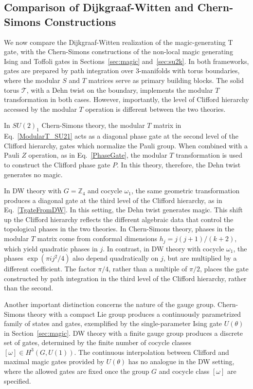 \documentclass[12pt,a4paper]{article}
\begin{document}
\subsection{Comparison of Dijkgraaf-Witten and Chern-Simons Constructions}\label{subsec:DW_vs_CS}

We now compare the Dijkgraaf-Witten realization of the magic-generating T gate, with the Chern-Simons constructions of the non-local magic generating Ising and Toffoli gates in Sections~\ref{sec:magic} and~\ref{sec:su2k}. In both frameworks, gates are prepared by path integration over $3$-manifolds with torus boundaries, where the modular $S$ and $T$ matrices serve as primary building blocks. The solid torus $\mathcal{T}$, with a Dehn twist on the boundary, implements the modular $T$ transformation in both cases. However, importantly, the level of Clifford hierarchy accessed by the modular $T$ operation is different between the two theories.

In $SU(2)_1$ Chern-Simons theory, the modular $T$ matrix in Eq.\ \eqref{ModularT_SU21} acts as a diagonal phase gate at the second level of the Clifford hierarchy, gates which normalize the Pauli group. When combined with a Pauli $Z$ operation, as in Eq.\ \eqref{PhaseGate}, the modular $T$ transformation is used to construct the Clifford phase gate $P$. In this theory, therefore, the Dehn twist generates no magic. 

In DW theory with $G = \mathbb{Z}_4$ and cocycle $\omega_1$, the same geometric transformation produces a diagonal gate at the third level of the Clifford hierarchy, as in Eq.\ \eqref{TgateFromDW}. In this setting, the Dehn twist generates magic. This shift up the Clifford hierarchy reflects the different algebraic data that control the topological phases in the two theories. In Chern-Simons theory, phases in the modular $T$ matrix come from conformal dimensions $h_j = j(j+1)/(k+2)$, which yield quadratic phases in $j$. In contrast, in DW theory with cocycle $\omega_1$, the phases $\exp(\pi i j^2/4)$ also depend quadratically on $j$, but are multiplied by a different coefficient. The factor $\pi/4$, rather than a multiple of $\pi/2$, places the gate constructed by path integration in the third level of the Clifford hierarchy, rather than the second.

Another important distinction concerns the nature of the gauge group. Chern-Simons theory with a compact Lie group produces a continuously parametrized family of states and gates, exemplified by the single-parameter Ising gate $U(\theta)$ in Section~\ref{sec:magic}. DW theory with a finite gauge group produces a discrete set of gates, determined by the finite number of cocycle classes $[\omega] \in H^3(G, U(1))$. The continuous interpolation between Clifford and maximal magic gates provided by $U(\theta)$ has no analogue in the DW setting, where the allowed gates are fixed once the group $G$ and cocycle class $[\omega]$ are specified.
\end{document}

